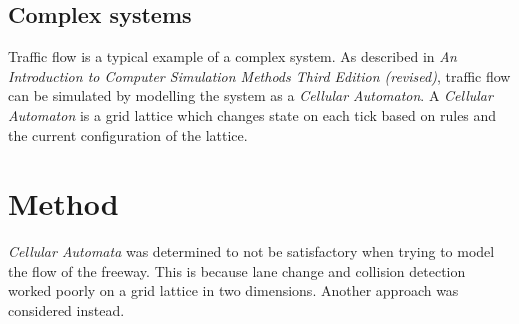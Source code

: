 \documentclass{article}
\begin{document}
  \subsection{Complex systems}
    Traffic flow is a typical example of a complex system. As described in \textit{An Introduction to Computer Simulation Methods Third Edition (revised)},
    traffic flow can be simulated by modelling the system as a \textit{Cellular Automaton}. A \textit{Cellular Automaton} is a
    grid lattice which changes state on each tick based on rules and the current configuration of the lattice. \cite{gould_introduction_nodate}
\section{Method}
  \textit{Cellular Automata} was determined to not be satisfactory when trying to model the flow of the freeway.
  This is because lane change and collision detection worked poorly on a grid lattice in two dimensions. Another
  approach was considered instead.
\end{document}
